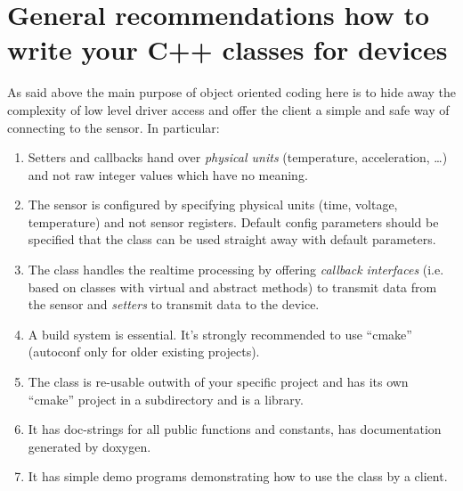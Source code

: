 \documentclass[12pt]{report}
\begin{document}
\section{General recommendations how to write your C++ classes for devices}
As said above the main purpose of object oriented coding here is to
hide away the complexity of low level driver access and offer the
client a simple and safe way of connecting to the sensor. In
particular:
\begin{enumerate}
\item Setters and callbacks hand over \textsl{physical units}
  (temperature, acceleration, \ldots) and not raw integer values which
  have no meaning.
\item The sensor is configured by specifying physical units (time,
  voltage, temperature) and not sensor registers. Default config parameters
  should be specified that the class can be used straight away with
  default parameters.
\item The class handles the realtime processing by offering \textsl{callback
  interfaces} (i.e. based on classes with virtual and abstract methods)
  to transmit data from the sensor and \textsl{setters} to transmit data to the device.
\item A build system is essential. It's strongly recommended to use ``cmake''
  (autoconf only for older existing projects).
\item The class is re-usable outwith of your specific project and has
  its own ``cmake'' project in a subdirectory and is a
  library.
\item It has doc-strings for all public functions and constants,
  has documentation generated by doxygen.
\item It has simple demo programs demonstrating how to use the class
  by a client.
\end{enumerate}
\end{document}
